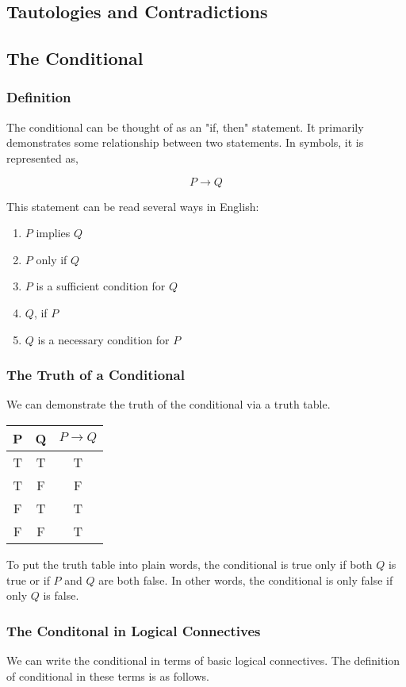 \documentclass{article}
\begin{document}
\subsection{Tautologies and Contradictions}

\subsection{The Conditional}
\subsubsection{Definition}
The conditional can be thought of as an "if, then" statement. It 
primarily demonstrates some relationship between two statements.
In symbols, it is represented as,

\[ P \rightarrow Q \]

\noindent This statement can be read several ways in English:
\begin{enumerate}
    \item $P$ implies $Q$
    \item $P$ only if $Q$
    \item $P$ is a sufficient condition for $Q$
    \item $Q$, if $P$
    \item $Q$ is a necessary condition for $P$
\end{enumerate}

\subsubsection{The Truth of a Conditional}
We can demonstrate the truth of the conditional via a truth table.
\begin{center}
    \begin{tabular}{c | c | c}
        P & Q & $P \rightarrow Q$ \\
        \hline
        T & T & T \\
        T & F & F \\
        F & T & T \\
        F & F & T \\
    \end{tabular}
\end{center}

To put the truth table into plain words, the conditional is
true only if both $Q$ is true or if $P$ and $Q$ are both false. In other
words, the conditional is only false if only $Q$ is false.

\subsubsection{The Conditonal in Logical Connectives}
We can write the conditional in terms of basic logical connectives.
The definition of conditional in these terms is as follows.
\end{document}
